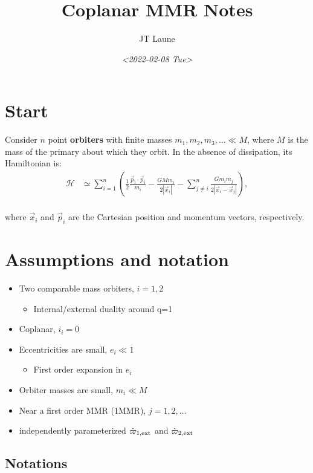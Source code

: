 \documentclass[11pt]{article}
\author{JT Laune}
\date{\textit{<2022-02-08 Tue>}}
\title{Coplanar MMR Notes}
\begin{document}
\maketitle

\section{Start}
\label{sec:org775029a}
Consider \(n\) point \textbf{orbiters} with finite masses
\(m_1,m_2,m_3,\ldots\ll M\), where \(M\) is the mass of the primary about
which they orbit. In the absence of dissipation, its Hamiltonian is:
\begin{align}
  \mathcal H
  &\simeq \sum^{n}_{i=1}\left(\frac12 \frac{\vec p_i\cdot\vec p_i}{m_i}
    -\frac{GMm_i}{2|\vec x_i|}
    -\sum_{j\neq i}^{n} \frac{Gm_im_j}{2|\vec x_i - \vec x_j|}
    \right), \\
\end{align}

where \(\vec x_i\) and \(\vec p_i\) are the Cartesian position and momentum vectors, respectively.

\section{Assumptions and notation}
\label{sec:orge773c0d}
\begin{itemize}
\item Two comparable mass orbiters, \(i=1,2\)
\begin{itemize}
\item Internal/external duality around q=1
\end{itemize}
\item Coplanar, \(i_i=0\)
\item Eccentricities are small, \(e_i\ll 1\)
\begin{itemize}
\item First order expansion in \(e_i\)
\end{itemize}
\item Orbiter masses are small, \(m_i\ll M\)
\item Near a first order MMR (1MMR), \(j = 1, 2, \ldots\)
\item independently parameterized \(\dot\varpi_{1,\rm ext}\) and \(\dot\varpi_{2,\rm ext}\)
\end{itemize}
\subsection{Notations}
\label{sec:org493b8b4}
\end{document}
